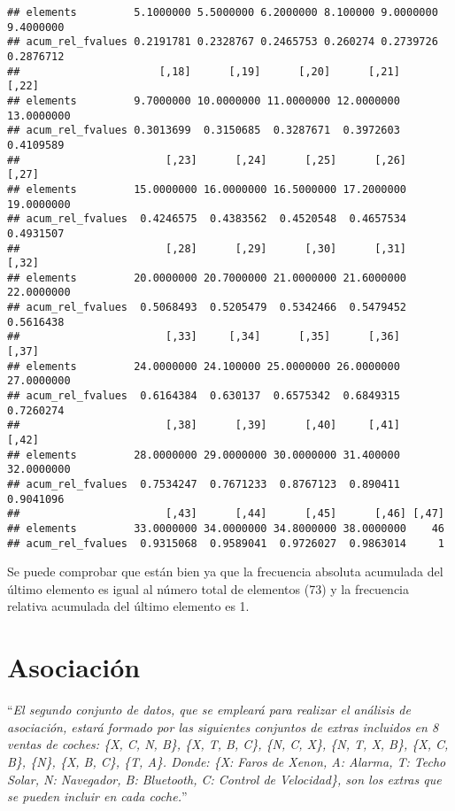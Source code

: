 \documentclass[12pt]{report}\usepackage[]{graphicx}\usepackage[dvipsnames]{xcolor}
\makeatletter
\newenvironment{kframe}{%
 \def\at@end@of@kframe{}%
 \ifinner\ifhmode%
  \def\at@end@of@kframe{\end{minipage}}%
  \begin{minipage}{\columnwidth}%
 \fi\fi%
 \def\FrameCommand##1{\hskip\@totalleftmargin \hskip-\fboxsep
 \colorbox{shadecolor}{##1}\hskip-\fboxsep
     \hskip-\linewidth \hskip-\@totalleftmargin \hskip\columnwidth}%
 \MakeFramed {\advance\hsize-\width
   \@totalleftmargin\z@ \linewidth\hsize
   \@setminipage}}%
 {\par\unskip\endMakeFramed%
 \at@end@of@kframe}
\newenvironment{knitrout}{}{} %
\makeatother
\begin{document}
\begin{knitrout}
\begin{kframe}
\begin{verbatim}
## elements         5.1000000 5.5000000 6.2000000 8.100000 9.0000000 9.4000000
## acum_rel_fvalues 0.2191781 0.2328767 0.2465753 0.260274 0.2739726 0.2876712
##                      [,18]      [,19]      [,20]      [,21]      [,22]
## elements         9.7000000 10.0000000 11.0000000 12.0000000 13.0000000
## acum_rel_fvalues 0.3013699  0.3150685  0.3287671  0.3972603  0.4109589
##                       [,23]      [,24]      [,25]      [,26]      [,27]
## elements         15.0000000 16.0000000 16.5000000 17.2000000 19.0000000
## acum_rel_fvalues  0.4246575  0.4383562  0.4520548  0.4657534  0.4931507
##                       [,28]      [,29]      [,30]      [,31]      [,32]
## elements         20.0000000 20.7000000 21.0000000 21.6000000 22.0000000
## acum_rel_fvalues  0.5068493  0.5205479  0.5342466  0.5479452  0.5616438
##                       [,33]     [,34]      [,35]      [,36]      [,37]
## elements         24.0000000 24.100000 25.0000000 26.0000000 27.0000000
## acum_rel_fvalues  0.6164384  0.630137  0.6575342  0.6849315  0.7260274
##                       [,38]      [,39]      [,40]     [,41]      [,42]
## elements         28.0000000 29.0000000 30.0000000 31.400000 32.0000000
## acum_rel_fvalues  0.7534247  0.7671233  0.8767123  0.890411  0.9041096
##                       [,43]      [,44]      [,45]      [,46] [,47]
## elements         33.0000000 34.0000000 34.8000000 38.0000000    46
## acum_rel_fvalues  0.9315068  0.9589041  0.9726027  0.9863014     1
\end{verbatim}
\end{kframe}
\end{knitrout}
			
			Se puede comprobar que están bien ya que la frecuencia absoluta acumulada del último elemento es igual al número total de elementos (73) y la frecuencia relativa acumulada del último elemento es 1.
		
			
		\section{Asociación}
		
			``\textit{El segundo conjunto de datos, que se empleará para realizar el análisis de asociación, estará formado por las siguientes conjuntos de extras incluidos en 8 ventas de coches: \{X, C, N, B\}, \{X, T, B, C\}, \{N, C, X\}, \{N, T, X, B\}, \{X, C, B\}, \{N\}, \{X, B, C\}, \{T, A\}. Donde: \{X: Faros de Xenon, A: Alarma, T: Techo Solar, N: Navegador, B: Bluetooth, C: Control de Velocidad\}, son los extras que se pueden incluir en cada coche.}''
		
\end{document}
